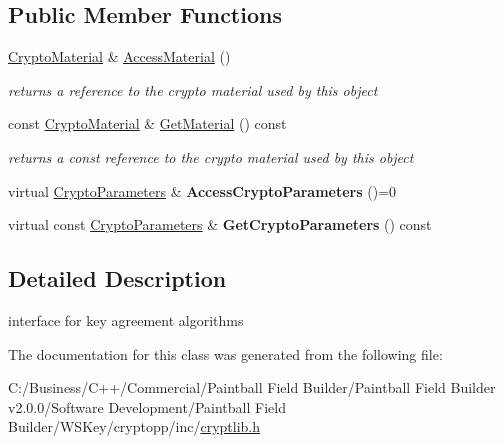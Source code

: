 \subsection*{Public Member Functions}
\begin{DoxyCompactItemize}
\item 
\hypertarget{class_key_agreement_algorithm_ab9c52198ff0dd877243c9520d96beaaa}{
\hyperlink{class_crypto_material}{CryptoMaterial} \& \hyperlink{class_key_agreement_algorithm_ab9c52198ff0dd877243c9520d96beaaa}{AccessMaterial} ()}
\label{class_key_agreement_algorithm_ab9c52198ff0dd877243c9520d96beaaa}

\begin{DoxyCompactList}\small\item\em returns a reference to the crypto material used by this object \item\end{DoxyCompactList}\item 
\hypertarget{class_key_agreement_algorithm_aeef052b9f5db7aa72d451c272e578e47}{
const \hyperlink{class_crypto_material}{CryptoMaterial} \& \hyperlink{class_key_agreement_algorithm_aeef052b9f5db7aa72d451c272e578e47}{GetMaterial} () const }
\label{class_key_agreement_algorithm_aeef052b9f5db7aa72d451c272e578e47}

\begin{DoxyCompactList}\small\item\em returns a const reference to the crypto material used by this object \item\end{DoxyCompactList}\item 
\hypertarget{class_key_agreement_algorithm_abbe709ef84c668901d9e6cf09167d9c9}{
virtual \hyperlink{class_crypto_parameters}{CryptoParameters} \& {\bfseries AccessCryptoParameters} ()=0}
\label{class_key_agreement_algorithm_abbe709ef84c668901d9e6cf09167d9c9}

\item 
\hypertarget{class_key_agreement_algorithm_ad3641afd3786b1fbd50a55c3c69a2389}{
virtual const \hyperlink{class_crypto_parameters}{CryptoParameters} \& {\bfseries GetCryptoParameters} () const }
\label{class_key_agreement_algorithm_ad3641afd3786b1fbd50a55c3c69a2389}

\end{DoxyCompactItemize}


\subsection{Detailed Description}
interface for key agreement algorithms 

The documentation for this class was generated from the following file:\begin{DoxyCompactItemize}
\item 
C:/Business/C++/Commercial/Paintball Field Builder/Paintball Field Builder v2.0.0/Software Development/Paintball Field Builder/WSKey/cryptopp/inc/\hyperlink{cryptlib_8h}{cryptlib.h}\end{DoxyCompactItemize}
